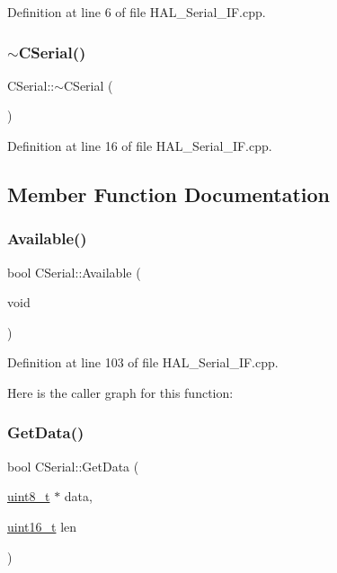 Definition at line 6 of file H\+A\+L\+\_\+\+Serial\+\_\+\+I\+F.\+cpp.

\mbox{\label{class_c_serial_aff5444dd7e6a9ddc43cbce0e959edf7a}} 
\subsubsection{\texorpdfstring{$\sim$CSerial()}{~CSerial()}}
{\footnotesize\ttfamily C\+Serial\+::$\sim$\+C\+Serial (\begin{DoxyParamCaption}{ }\end{DoxyParamCaption})}



Definition at line 16 of file H\+A\+L\+\_\+\+Serial\+\_\+\+I\+F.\+cpp.



\subsection{Member Function Documentation}
\mbox{\label{class_c_serial_abb43734223d937a86e7616636ea16024}} 
\subsubsection{\texorpdfstring{Available()}{Available()}}
{\footnotesize\ttfamily bool C\+Serial\+::\+Available (\begin{DoxyParamCaption}\item[{void}]{ }\end{DoxyParamCaption})}



Definition at line 103 of file H\+A\+L\+\_\+\+Serial\+\_\+\+I\+F.\+cpp.

Here is the caller graph for this function\+:
\mbox{\label{class_c_serial_abad86c07f530569b2ceeea75bda485ad}} 
\subsubsection{\texorpdfstring{GetData()}{GetData()}}
{\footnotesize\ttfamily bool C\+Serial\+::\+Get\+Data (\begin{DoxyParamCaption}\item[{\mbox{\hyperlink{_a_d_a_s___types_8h_aba7bc1797add20fe3efdf37ced1182c5}{uint8\+\_\+t}} $\ast$}]{data,  }\item[{\mbox{\hyperlink{_a_d_a_s___types_8h_a1f1825b69244eb3ad2c7165ddc99c956}{uint16\+\_\+t}}}]{len }\end{DoxyParamCaption})}



